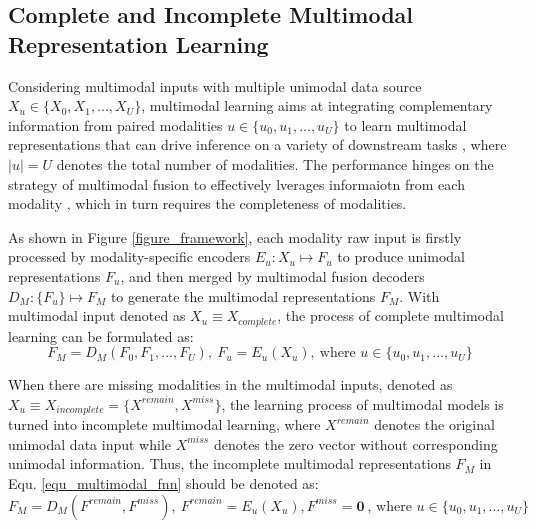 \documentclass{article}
\begin{document}
\subsection{Complete and Incomplete Multimodal Representation Learning}
Considering multimodal inputs with multiple unimodal data source $X_u\in\{X_0, X_1,..., X_U\}$, multimodal learning aims at integrating complementary information from paired modalities $u\in\{u_0,u_1,...,u_U\}$ to learn multimodal representations that can drive inference on a variety of downstream tasks \cite{wang2023large,zhang2024mm}, where $|u|=U$ denotes the total number of modalities. The performance hinges on the strategy of multimodal fusion to effectively lverages informaiotn from each modality \cite{gkoumas2021makes,manzoor2023multmodality}, which in turn requires the completeness of modalities.  

As shown in Figure \ref{figure_framework}, each modality raw input is firstly processed by modality-specific encoders $E_u:X_u\mapsto F_u$ to produce unimodal representations $F_u$, and then merged by multimodal fusion decoders $D_M:\{F_u\}\mapsto F_M$ to generate the multimodal representations $F_M$. With multimodal input denoted as $X_u \equiv X_{complete}$, the process of complete multimodal learning can be formulated as:
\begin{equation}
    F_M=D_M(F_0,F_1,...,F_U),\ F_u=E_u(X_u),\ \text{where } u \in \{u_0,u_1,...,u_U\}
\label{equ_multimodal_fnn}
\end{equation}

When there are missing modalities in the multimodal inputs, denoted as $X_u \equiv X_{incomplete}=\{X^{remain}, X^{miss}\}$, the learning process of multimodal models is turned into incomplete multimodal learning, where $X^{remain}$ denotes the original unimodal data input while $X^{miss}$ denotes the zero vector without corresponding unimodal information. Thus, the incomplete multimodal representations $F_M$ in Equ. \ref{equ_multimodal_fnn} should be denoted as:
\begin{equation}
    F_M=D_M(F^{remain},F^{miss}),\ F^{remain}=E_u(X_u), F^{miss} = \textbf{0} \ \text{, where } u \in \{u_0,u_1,...,u_U\}
\end{equation}
\end{document}
